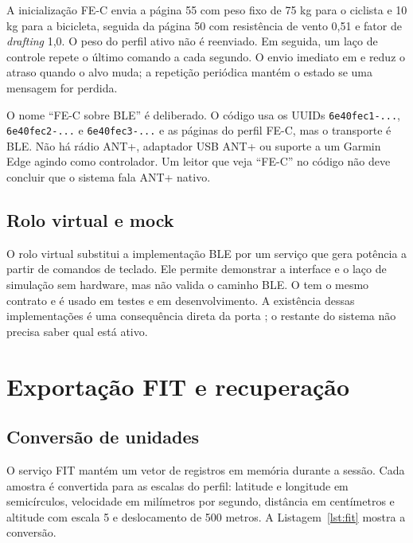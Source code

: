 A inicialização FE-C envia a página 55 com peso fixo de 75 kg para o ciclista e
10 kg para a bicicleta, seguida da página 50 com resistência de vento 0,51 e
fator de \textit{drafting} 1,0. O peso do perfil ativo não é reenviado. Em
seguida, um laço de controle repete o último comando a cada segundo. O envio
imediato em  e  reduz o atraso quando o alvo
muda; a repetição periódica mantém o estado se uma mensagem for perdida.

O nome ``FE-C sobre BLE'' é deliberado. O código usa os UUIDs
\texttt{6e40fec1-...}, \texttt{6e40fec2-...} e \texttt{6e40fec3-...} e as
páginas do perfil FE-C, mas o transporte é BLE. Não há rádio ANT+, adaptador USB
ANT+ ou suporte a um Garmin Edge agindo como controlador. Um leitor que veja
``FE-C'' no código não deve concluir que o sistema fala ANT+ nativo.

\subsection{Rolo virtual e mock}
\label{sec:implementacao-virtual}

O rolo virtual substitui a implementação BLE por um serviço que gera
potência a partir de comandos de teclado. Ele permite demonstrar a interface e o
laço de simulação sem hardware, mas não valida o caminho BLE. O 
tem o mesmo contrato e é usado em testes e em desenvolvimento. A existência
dessas implementações é uma consequência direta da porta ;
o restante do sistema não precisa saber qual está ativo.

\section{Exportação FIT e recuperação}
\label{sec:implementacao-fit}

\subsection{Conversão de unidades}
\label{sec:implementacao-fit-unidades}

O serviço FIT mantém um vetor de registros em memória durante a sessão. Cada
amostra é convertida para as escalas do perfil: latitude e longitude em
semicírculos, velocidade em milímetros por segundo, distância em centímetros e
altitude com escala 5 e deslocamento de 500 metros. A Listagem~\ref{lst:fit}
mostra a conversão.

